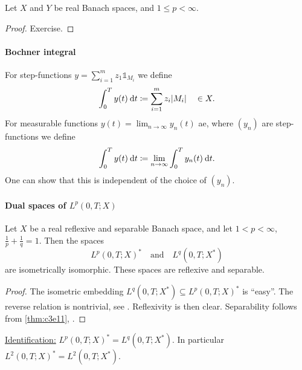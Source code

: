 \documentclass[../skript.tex]{subfiles}
\begin{document}
\begin{proposition} %
\label{thm:c3e10}
Let $X$ and $Y$ be real Banach spaces, and $1 \leq p < \infty$.
\end{proposition}
\begin{proof}
Exercise.
\end{proof}
\paragraph{Bochner integral}
For step-functions $y = \sum_{i=1}^m z_1 \mathds{1}_{M_i}$ we define
\[
	\int_0^T y(t) \:\mathrm{d}t \coloneqq \sum_{i=1}^m z_i |M_i| \quad \in X.
\]
For measurable functions $y(t) = \lim_{n \to \infty} y_n(t)$ \ac{ae}, where $(y_n)$ are step-functions we define
\[
	\int_0^T y(t) \:\mathrm{d}t \coloneqq \lim_{n \to \infty} \int_0^T y_n(t) \:\mathrm{d}t.
\]
One can show that this is independent of the choice of $(y_n)$.
\paragraph{Dual spaces of \texorpdfstring{$L^p(0, T; X)$}{Lp(0, T; X)}}
\begin{proposition} %
\label{thm:c3e11}
Let $X$ be a real reflexive and separable Banach space, and let $1 < p < \infty$, $\frac{1}{p} + \frac{1}{q} = 1$. Then the spaces
\[
	L^p(0, T; X)^* \quad \text{and} \quad L^q(0, T; X^*)
\]
are isometrically isomorphic. These spaces are reflexive and separable.
\end{proposition}
\begin{proof}
The isometric embedding $L^q(0, T; X^*) \subseteq L^p(0, T; X)^*$ is ``easy''. The reverse relation is nontrivial, see \cite[8.20.5]{Edwards}. %
Reflexivity is then clear. Separability follows from \cref{thm:c3e11}, .
\end{proof}
\underline{Identification:} $L^p(0, T; X)^* = L^q(0, T; X^*)$.
In particular $L^2(0, T; X)^* = L^2(0, T; X^*)$.
\end{document}
